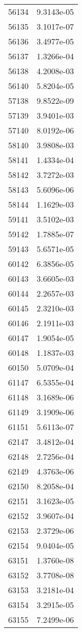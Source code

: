 \begin{table}[h!]
\begin{tabular}{|| c || c |}
56134 & 9.3143e-05 \\
56135 & 3.1017e-07 \\
56136 & 3.4977e-05 \\
56137 & 1.3266e-04 \\
56138 & 4.2008e-03 \\
56140 & 5.8204e-05 \\
57138 & 9.8522e-09 \\
57139 & 3.9401e-03 \\
57140 & 8.0192e-06 \\
58140 & 3.9808e-03 \\
58141 & 1.4334e-04 \\
58142 & 3.7272e-03 \\
58143 & 5.6096e-06 \\
58144 & 1.1629e-03 \\
59141 & 3.5102e-03 \\
59142 & 1.7885e-07 \\
59143 & 5.6571e-05 \\
60142 & 6.3856e-05 \\
60143 & 3.6605e-03 \\
60144 & 2.2657e-03 \\
60145 & 2.3210e-03 \\
60146 & 2.1911e-03 \\
60147 & 1.9054e-05 \\
60148 & 1.1837e-03 \\
60150 & 5.0709e-04 \\
61147 & 6.5355e-04 \\
61148 & 3.1689e-06 \\
61149 & 3.1909e-06 \\
61151 & 5.6113e-07 \\
62147 & 3.4812e-04 \\
62148 & 2.7256e-04 \\
62149 & 4.3763e-06 \\
62150 & 8.2058e-04 \\
62151 & 3.1623e-05 \\
62152 & 3.9607e-04 \\
62153 & 2.3729e-06 \\
62154 & 9.0404e-05 \\
63151 & 1.3760e-08 \\
63152 & 3.7708e-08 \\
63153 & 3.2181e-04 \\
63154 & 3.2915e-05 \\
63155 & 7.2499e-06 \\

\end{tabular}
\end{table}
